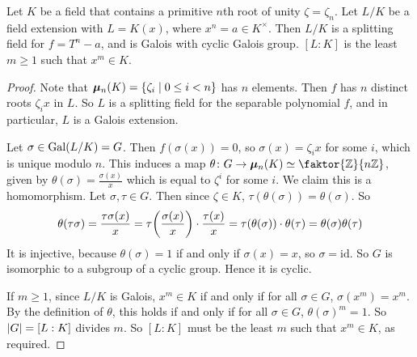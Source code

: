 \begin{theorem}
	Let \( K \) be a field that contains a primitive \( n \)th root of unity \( \zeta = \zeta_n \).
	Let \( L / K \) be a field extension with \( L = K(x) \), where \( x^n = a \in K^\times \).
	Then \( L / K \) is a splitting field for \( f = T^n - a \), and is Galois with cyclic Galois group.
	\( [L : K] \) is the least \( m \geq 1 \) such that \( x^m \in K \).
\end{theorem}
\begin{proof}
	Note that \( \bm \mu_n(K) = \qty{\zeta_i \mid 0 \leq i < n} \) has \( n \) elements.
	Then \( f \) has \( n \) distinct roots \( \zeta_i x \) in \( L \).
	So \( L \) is a splitting field for the separable polynomial \( f \), and in particular, \( L \) is a Galois extension.

	Let \( \sigma \in \operatorname{Gal}(L/K) = G \).
	Then \( f(\sigma(x)) = 0 \), so \( \sigma(x) = \zeta_i x \) for some \( i \), which is unique modulo \( n \).
	This induces a map \( \theta \colon G \to \bm \mu_n(K) \simeq \faktor{\mathbb Z}{n\mathbb Z} \), given by \( \theta(\sigma) = \frac{\sigma(x)}{x} \) which is equal to \( \zeta^i \) for some \( i \).
	We claim this is a homomorphism.
	Let \( \sigma, \tau \in G \).
	Then since \( \zeta \in K \), \( \tau(\theta(\sigma)) = \theta(\sigma) \).
	So
	\[ \theta(\tau\sigma) = \frac{\tau\sigma(x)}{x} = \tau\qty(\frac{\sigma(x)}{x}) \cdot \frac{\tau(x)}{x} = \tau(\theta(\sigma)) \cdot \theta(\tau) = \theta(\sigma) \theta(\tau) \]
	It is injective, because \( \theta(\sigma) = 1 \) if and only if \( \sigma(x) = x \), so \( \sigma = \mathrm{id} \).
	So \( G \) is isomorphic to a subgroup of a cyclic group.
	Hence it is cyclic.

	If \( m \geq 1 \), since \( L / K \) is Galois, \( x^m \in K \) if and only if for all \( \sigma \in G \), \( \sigma(x^m) = x^m \).
	By the definition of \( \theta \), this holds if and only if for all \( \sigma \in G \), \( \theta(\sigma)^m = 1 \).
	So \( \abs{G} = [L:K] \) divides \( m \).
	So \( [L:K] \) must be the least \( m \) such that \( x^m \in K \), as required.
\end{proof}
